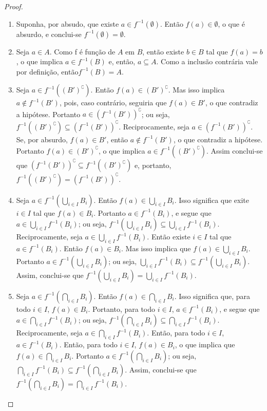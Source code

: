 \begin{proof}
	\begin{enumerate}
	\item Suponha, por absudo, que existe $a \in f^{-1}(\emptyset)$. Então $f(a) \in \emptyset$, o que é absurdo, e conclui-se $f^{-1}(\emptyset) = \emptyset$.
	\item Seja $a \in A$. Como f é função de $A$ em $B$, então existe $b \in B$ tal que $f(a)=b$, o que implica $a \in f^{-1}(B)$ e, então, $a \subseteq A$. Como a inclusão contrária vale por definição, então$f^{-1}(B) = A$.
	\item Seja $a \in f^{-1}((B')^\complement)$. Então $f(a) \in (B')^\complement$. Mas isso implica $a \notin f^{-1}(B')$, pois, caso contrário, seguiria que $f(a) \in B'$, o que contradiz a hipótese. Portanto $a \in (f^{-1}(B'))^\complement$; ou seja, $f^{-1}((B')^\complement) \subseteq (f^{-1}(B'))^\complement$. Reciprocamente, seja $a \in (f^{-1}(B'))^\complement$. Se, por absurdo, $f(a) \in B'$, então $a \notin f^{-1}(B')$, o que contradiz a hipótese. Portanto $f(a) \in (B')^\complement$, o que implica $a \in f^{-1}((B')^\complement)$. Assim conclui-se que $(f^{-1}(B'))^\complement \subseteq f^{-1}((B')^\complement)$ e, portanto, $f^{-1}((B')^\complement) = (f^{-1}(B'))^\complement$.
	\item Seja $a \in f^{-1}(\bigcup_{i \in I} B_i)$. Então $f(a) \in \bigcup_{i \in I} B_i$. Isso significa que exite $i \in I$ tal que $f(a) \in B_i$. Portanto $a \in f^{-1}(B_i)$, e segue que $a \in \bigcup_{i \in I} f^{-1}(B_i)$; ou seja, $f^{-1}(\bigcup_{i \in I} B_i) \subseteq \bigcup_{i \in I} f^{-1}(B_i)$. Reciprocamente, seja $a \in \bigcup_{i \in I} f^{-1}(B_i)$. Então existe $i \in I$ tal que $a \in f^{-1}(B_i)$. Então $f(a) \in B_i$. Mas isso implica que $f(a) \in \bigcup_{i \in I} B_i$. Portanto $a \in f^{-1}(\bigcup_{i \in I} B_i)$; ou seja, $\bigcup_{i \in I} f^{-1}(B_i) \subseteq f^{-1}(\bigcup_{i \in I} B_i)$. Assim, conclui-se que $f^{-1}(\bigcup_{i \in I} B_i) = \bigcup_{i \in I} f^{-1}(B_i)$.
	\item Seja $a \in f^{-1}(\bigcap_{i \in I} B_i)$. Então $f(a) \in \bigcap_{i \in I} B_i$. Isso significa que, para todo $i \in I$, $f(a) \in B_i$. Portanto, para todo $i \in I$, $a \in f^{-1}(B_i)$, e segue que $a \in \bigcap_{i \in I} f^{-1}(B_i)$; ou seja, $f^{-1}(\bigcap_{i \in I} B_i) \subseteq \bigcap_{i \in I} f^{-1}(B_i)$. Reciprocamente, seja $a \in \bigcap_{i \in I} f^{-1}(B_i)$. Então, para todo $i \in I$, $a \in f^{-1}(B_i)$. Então, para todo $i \in I$, $f(a) \in B_i$, o que implica que $f(a) \in \bigcap_{i \in I} B_i$. Portanto $a \in f^{-1}(\bigcap_{i \in I} B_i)$; ou seja, $\bigcap_{i \in I} f^{-1}(B_i) \subseteq f^{-1}(\bigcap_{i \in I} B_i)$. Assim, conclui-se que $f^{-1}(\bigcap_{i \in I} B_i) = \bigcap_{i \in I} f^{-1}(B_i)$.
\qedhere
	\end{enumerate}
\end{proof}

